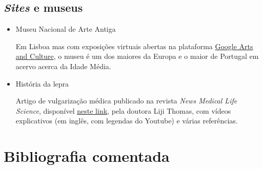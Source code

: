 \documentclass[12pt]{extarticle}
\begin{document}
\subsection{\emph{Sites} e museus}

\begin{itemize}

\item Museu Nacional de Arte Antiga

	Em Lisboa mas com exposições virtuais abertas na plataforma \href{https://artsandculture.google.com/partner/national-museum-of-ancient-art}{Google Arts and Culture}, o museu 
	é um dos maiores da Europa e o maior de Portugal em acervo acerca da Idade Média.  

\item História da lepra

Artigo de vulgarização médica publicado na revista \textit{News 
Medical Life Science}, disponível 
\href{https://www.news-medical.net/health/History-of-leprosy-(Portuguese).aspx\#:\~:text=A\%20lepra\%20originou\%20em\%20\%C3\%81frica,das\%20trevas\%2C\%20at\%C3\%A9\%20aproximadamente\%201870.}{neste link}, pela doutora Liji Thomas, com 
vídeos explicativos (em inglês, com legendas do Youtube) e várias referências. 

\end{itemize}


\section{Bibliografia comentada}
\end{document}
